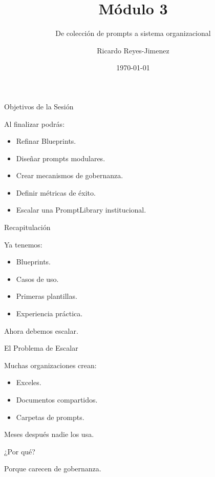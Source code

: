 \documentclass[aspectratio=169]{beamer}
\title[Módulo 3]{Módulo 3}
\subtitle{ De colección de prompts a sistema organizacional}
\author{Ricardo Reyes-Jimenez}
\institute{Universidad de La Sabana}
\date{\today}
\begin{document}
\begin{frame}
  \titlepage
\end{frame}

\usebackgroundtemplate{}


\begin{frame}{Objetivos de la Sesión}


Al finalizar podrás:

\begin{itemize}
  \item Refinar Blueprints.
  \item Diseñar prompts modulares.
  \item Crear mecanismos de gobernanza.
  \item Definir métricas de éxito.
  \item Escalar una PromptLibrary institucional.
\end{itemize}
\end{frame}

\begin{frame}{Recapitulación}


Ya tenemos:

\begin{itemize}
  \item Blueprints.
  \item Casos de uso.
  \item Primeras plantillas.
  \item Experiencia práctica.
\end{itemize}
Ahora debemos escalar.

\end{frame}

\begin{frame}{El Problema de Escalar}


Muchas organizaciones crean:

\begin{itemize}
  \item Exceles.
  \item Documentos compartidos.
  \item Carpetas de prompts.
\end{itemize}
Meses después nadie los usa.

¿Por qué?

Porque carecen de gobernanza.

\end{frame}
\end{document}
